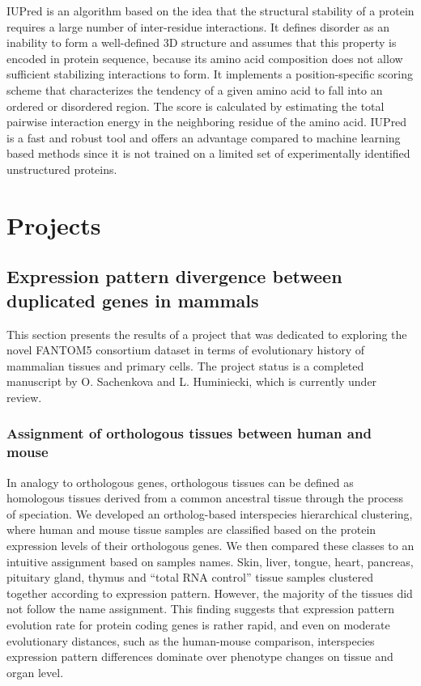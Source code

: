 \documentclass[11pt, a4paper,oneside]{report}
\newcommand{\mychapter}[2]{
    \setcounter{chapter}{#1}
    \setcounter{section}{0}
    \chapter*{#2}
    \addcontentsline{toc}{chapter}{#2}
}
\begin{document}
  IUPred\cite{Dosztanyi2005} is an algorithm based on the idea that the structural stability of a protein requires a large number of inter-residue interactions. It defines disorder as an inability to form a well-defined 3D structure and assumes that this property is encoded in protein sequence, because its amino acid composition does not allow sufficient stabilizing interactions to form. 
It implements a position-specific scoring scheme that characterizes the tendency of a given amino acid to fall into an ordered or disordered region. The score is calculated by estimating the total pairwise interaction energy in the neighboring residue of the amino acid. IUPred is a fast and robust tool and offers an advantage compared to machine learning based methods since it is not trained on a limited set of experimentally identified unstructured proteins.  

\mychapter{3}{Projects}
\section{Expression pattern divergence between duplicated genes in mammals}
This section presents the results of a project that was dedicated to exploring the novel FANTOM5 consortium dataset in terms of evolutionary history of mammalian tissues and primary cells. The project status is a completed manuscript by O. Sachenkova and L. Huminiecki, which is currently under review. 
\subsection{Assignment of orthologous tissues between human and mouse}
In analogy to orthologous genes, orthologous tissues can be defined as homologous tissues derived from a common ancestral tissue through the process of speciation.  We developed an ortholog-based interspecies hierarchical clustering, where human and mouse tissue samples are classified based on the protein expression levels of their orthologous genes. We then compared these classes to an intuitive assignment based on samples names. Skin, liver, tongue, heart, pancreas, pituitary gland, thymus and “total RNA control” tissue samples clustered together according to expression pattern. However, the majority of the tissues did not follow the name assignment.  This finding suggests that expression pattern evolution rate for protein coding genes is rather rapid, and even on moderate evolutionary distances, such as the human-mouse comparison, interspecies expression pattern differences dominate over phenotype changes on tissue and organ level. 
\end{document}
